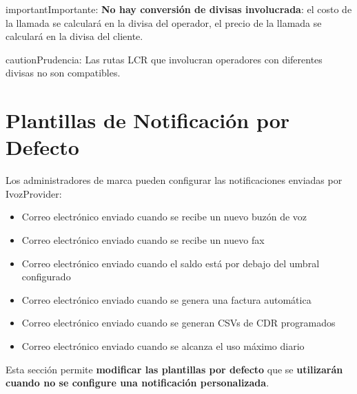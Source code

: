 \documentclass[letterpaper,10pt,spanish]{sphinxmanual}
\begin{document}
\begin{notice}{important}{Importante:}
\textbf{No hay conversión de divisas involucrada}: el costo de la llamada se calculará en la divisa del operador, el precio de la llamada se calculará en la divisa del cliente.
\end{notice}

\begin{notice}{caution}{Prudencia:}
Las rutas LCR que involucran operadores con diferentes divisas no son compatibles.
\end{notice}
\label{administration_portal/platform/default_notification_templates:default-notification-templates}

\section{Plantillas de Notificación por Defecto}
\label{administration_portal/platform/default_notification_templates:id2}\label{administration_portal/platform/default_notification_templates::doc}\label{administration_portal/platform/default_notification_templates:default-notification-templates}\label{administration_portal/platform/default_notification_templates:id1}
Los administradores de marca pueden configurar las notificaciones enviadas por IvozProvider:
\begin{itemize}
\item {} 
Correo electrónico enviado cuando se recibe un nuevo buzón de voz

\item {} 
Correo electrónico enviado cuando se recibe un nuevo fax

\item {} 
Correo electrónico enviado cuando el saldo está por debajo del umbral configurado

\item {} 
Correo electrónico enviado cuando se genera una factura automática

\item {} 
Correo electrónico enviado cuando se generan CSVs de CDR programados

\item {} 
Correo electrónico enviado cuando se alcanza el uso máximo diario

\end{itemize}

Esta sección permite \textbf{modificar las plantillas por defecto} que se \textbf{utilizarán cuando no se configure una notificación personalizada}.
\end{document}
